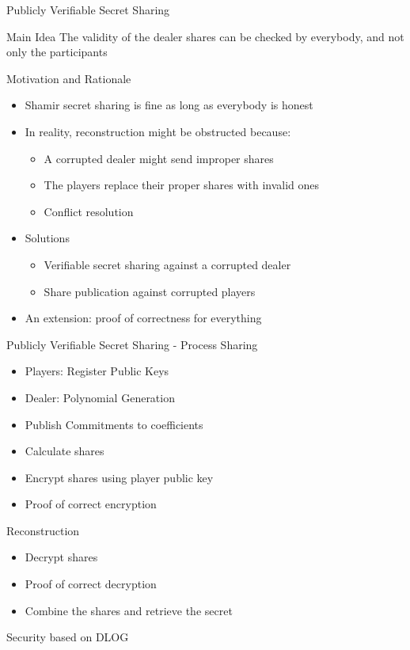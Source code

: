 \documentclass{beamer}
\begin{document}
\begin{frame}{Publicly Verifiable Secret Sharing}
\begin{block}{Main Idea}
The validity of the dealer shares can be checked by everybody, and not only the participants
\end{block}
Motivation and Rationale
\begin{itemize}
\item Shamir secret sharing is fine as long as everybody is honest
\item In reality, reconstruction might be obstructed because:
\begin{itemize}
\item A corrupted dealer might send improper shares
\item The players replace their proper shares with invalid ones
\item Conflict resolution
\end{itemize}
\item Solutions
\begin{itemize}
\item Verifiable secret sharing against a corrupted dealer
\item Share publication against corrupted players
\end{itemize}
\item An extension: proof of correctness for everything
\end{itemize}
\end{frame} 


\begin{frame}{Publicly Verifiable Secret Sharing - Process}
Sharing
\begin{itemize}
\item Players: Register Public Keys
\item Dealer: Polynomial Generation
\item Publish Commitments to coefficients
\item Calculate shares
\item Encrypt shares using player public key
\item Proof of correct encryption
\end{itemize}
Reconstruction
\begin{itemize}
\item Decrypt shares
\item Proof of correct decryption
\item Combine the shares and retrieve the secret
\end{itemize}
\cite{PVSS99} Security based on DLOG
\end{frame} 
\end{document}
